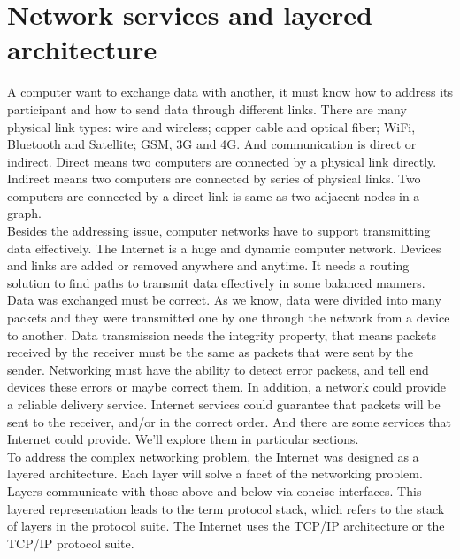 \documentclass[a4paper, 11pt]{article}
\begin{document}
\clearpage
\section{Network services and layered architecture}

A computer want to exchange data with another, it must know how to address its participant and how to send data through different links. There are many physical link types: wire and wireless; copper cable and optical fiber;  WiFi, Bluetooth and Satellite; GSM, 3G and 4G. And communication is direct or indirect. Direct means two computers are connected by a physical link directly. Indirect means two computers are connected by series of physical links. Two computers are connected by a direct link is same as two adjacent nodes in a graph.\\

Besides the addressing issue, computer networks have to support transmitting data effectively. The Internet is a huge and dynamic computer network. Devices and links are added or removed anywhere and anytime. It needs a routing solution to find paths to transmit data effectively in some balanced manners.\\

Data was exchanged must be correct. As we know, data were divided into many packets and they were transmitted one by one through the network from a device to another. Data transmission needs the integrity property, that means packets received by the receiver must be the same as packets that were sent by the sender. Networking must have the ability to detect error packets, and tell end devices these errors or maybe correct them. In addition, a network could provide a reliable delivery service. Internet services could guarantee that packets will be sent to the receiver, and/or in the correct order. And there are some services that Internet could provide. We'll explore them in particular sections.\\

To address the complex networking problem, the Internet was designed as a layered architecture. Each layer will solve a facet of the networking problem. Layers communicate with those above and below via concise interfaces. This layered representation leads to the term protocol stack, which refers to the stack of layers in the protocol suite. The Internet uses the TCP/IP architecture or the TCP/IP protocol suite. \\
\end{document}
